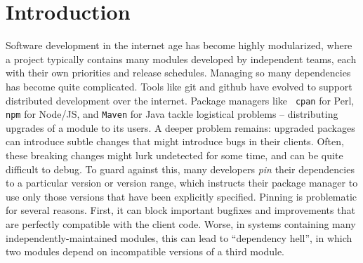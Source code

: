 \section{Introduction}

Software development in the internet age has become highly
modularized, where a project typically contains many modules developed
by independent teams, each with their own priorities and release
schedules. Managing so many dependencies has become quite
complicated. Tools like git and github have evolved to support
distributed development over the internet. Package managers like {\tt
  cpan} for Perl, {\tt npm} for Node/JS,
and {\tt Maven} for Java tackle logistical problems --
distributing upgrades of a module to its users. A deeper problem
remains: upgraded packages can introduce subtle changes that might
introduce bugs in their clients. Often, these breaking changes might
lurk undetected for some time, and can be quite difficult to debug. To
guard against this, many developers {\em pin} their dependencies to a
particular version or version range, which instructs their package
manager to use only those versions that have been explicitly
specified. Pinning is problematic for several reasons.
%
First, it can block important bugfixes and improvements that are
perfectly compatible with the client code.
%
Worse, in systems containing many independently-maintained modules,
this can lead to ``dependency hell''\cite{hell}, in which two modules
depend on incompatible versions of a third module.



